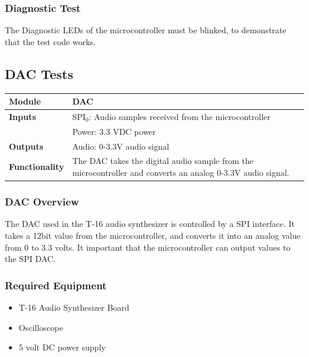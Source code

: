 \documentclass{article}
\begin{document}
\subsubsection{Diagnostic Test}
The Diagnostic LEDs of the microcontroller must be blinked, to
demonstrate that the test code works.

\subsection{DAC Tests}

\begin{tabular}{|p{1in}|p{5in}|}
\hline
\textbf{Module} & DAC \\
\hline
\textbf{Inputs}& SPI$_0$: Audio samples received from the microcontroller\\
	     & Power: 3.3 VDC power\\
\hline
\textbf{Outputs}& Audio: 0-3.3V audio signal \\ 
\hline
\textbf{Functionality}& The DAC takes the digital audio sample from the microcontroller and converts an analog 0-3.3V audio signal.\\
\hline
\end{tabular}

\subsubsection{DAC Overview}
The DAC used in the T-16 audio synthesizer is controlled by a SPI
interface. It takes a 12bit value from the microcontroller, and
converts it into an analog value from 0 to 3.3 volts. It important
that the microcontroller can output values to the SPI DAC. 

\subsubsection{Required Equipment}
\begin{itemize}
  \item T-16 Audio Synthesizer Board
  \item Oscilloscope
  \item 5 volt DC power supply
\end{itemize}
\end{document}

